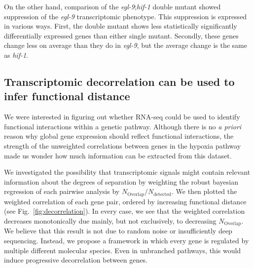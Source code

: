 \documentclass[9pt,twocolumn,twoside]{pnas-new}
\newcommand{\egl}{\emph{egl-9}}
\newcommand{\hif}{\emph{hif-1}}
\begin{document}
On the other hand, comparison of the \egl{};\hif{} double mutant showed suppression of the \egl{} transcriptomic phenotype. This suppression is expressed in various ways. First, the double mutant shows less statistically significantly differentially expressed genes than either single mutant. Secondly, these genes change less on average than they do in \egl{}, but the average change is the same as \hif{}.

\subsection{Transcriptomic decorrelation can be used to infer functional distance}
\label{sub:decorrelation}
We were interested in figuring out whether RNA-seq could be used to identify functional interactions within a genetic pathway. Although there is no \emph{a priori} reason why global gene expression should reflect functional interactions, the strength of the unweighted correlations between genes in the hypoxia pathway made us wonder how much information can be extracted from this dataset.

We investigated the possibility that transcriptomic signals might contain relevant information about the degrees of separation by weighting the robust bayesian regression of each pairwise analysis by $N_\mathrm{Overlap}/N_{\mathrm{detected}}$. We then plotted the weighted correlation of each gene pair, ordered by increasing functional distance (see Fig.~\ref{fig:decorrelation}). In every case, we see that the weighted correlation decreases monotonically due mainly, but not exclusively, to decreasing $N_\mathrm{Overlap}$.
We believe that this result is not due to random noise or insufficiently deep sequencing. Instead, we propose a framework in which every gene is regulated by multiple different molecular species. Even in unbranched pathways, this would induce progressive decorrelation between genes.
\end{document}
